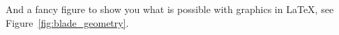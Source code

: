         And a fancy figure to show you what is possible with graphics in \LaTeX, see Figure~\ref{fig:blade_geometry}.
